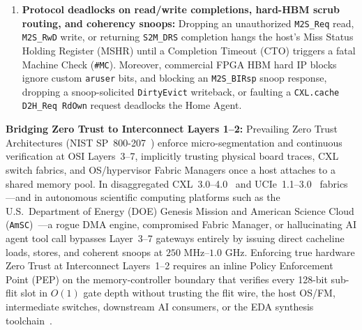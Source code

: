 \documentclass[10pt,twocolumn]{article}
\theoremstyle{spectralthm}
\begin{document}
\begin{enumerate}
  \item \textbf{Protocol deadlocks on read/write completions, hard-HBM scrub routing, and coherency snoops:} Dropping an unauthorized \texttt{M2S\_Req} read, \texttt{M2S\_RwD} write, or returning \texttt{S2M\_DRS} completion hangs the host's Miss Status Holding Register (MSHR) until a Completion Timeout (CTO) triggers a fatal Machine Check (\texttt{\#MC}). Moreover, commercial FPGA HBM hard IP blocks ignore custom \texttt{aruser} bits, and blocking an \texttt{M2S\_BIRsp} snoop response, dropping a snoop-solicited \texttt{DirtyEvict} writeback, or faulting a \texttt{CXL.cache D2H\_Req RdOwn} request deadlocks the Home Agent.
\end{enumerate}

\noindent\textbf{Bridging Zero Trust to Interconnect Layers 1--2:}
Prevailing Zero Trust Architectures (NIST SP~800-207~\cite{rose2020zta}) enforce micro-segmentation and continuous verification at OSI Layers~3--7, implicitly trusting physical board traces, CXL switch fabrics, and OS/hypervisor Fabric Managers once a host attaches to a shared memory pool. In disaggregated \mbox{CXL~3.0--4.0}~\cite{cxl2025spec} and \mbox{UCIe~1.1--3.0}~\cite{ucie2025spec30} fabrics---and in autonomous scientific computing platforms such as the U.S.\ Department of Energy (DOE) Genesis Mission and American Science Cloud (\texttt{AmSC})~\cite{doe2025genesis}---a rogue DMA engine, compromised Fabric Manager, or hallucinating AI agent tool call bypasses Layer~3--7 gateways entirely by issuing direct cacheline loads, stores, and coherent snoops at $250\text{~MHz}$--$1.0\text{~GHz}$. Enforcing true hardware Zero Trust at Interconnect Layers~1--2 requires an inline Policy Enforcement Point (PEP) on the memory-controller boundary that verifies every 128-bit sub-flit slot in $O(1)$ gate depth without trusting the flit wire, the host OS/FM, intermediate switches, downstream AI consumers, or the EDA synthesis toolchain~\cite{ncdsmo2020rain}.
\end{document}
